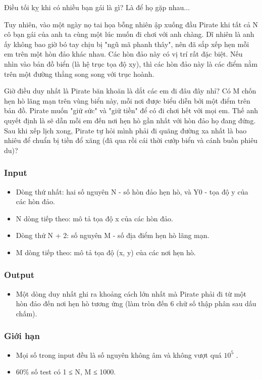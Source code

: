 



   Điều tối kỵ khi có nhiều bạn gái là gì? Là để họ gặp nhau...  

   Tuy nhiên, vào một ngày nọ tai họa bỗng nhiên ập xuống đầu Pirate khi tất cả N cô bạn gái của anh ta cùng một lúc muốn đi chơi với anh chàng. Dĩ nhiên là anh ấy không bao giờ bó tay chịu bị "ngũ mã phanh thây", nên đã sắp xếp hẹn mỗi em trên một hòn đảo khác nhau. Các hòn đảo này có vị trí rất đặc biệt. Nếu nhìn vào bản đồ biển (là hệ trục tọa độ xy), thì các hòn đảo này là các điểm nằm trên một đường thẳng song song với trục hoành.  

   Giờ điều duy nhất là Pirate băn khoăn là dắt các em đi đâu đây nhỉ? Có M chốn hẹn hò lãng mạn trên vùng biển này, mỗi nơi được biểu diễn bởi một điểm trên bản đồ. Pirate muốn "giữ sức" và "giữ tiền" để có đi chơi hết với mọi em. Thế anh quyết định là sẽ dẫn mỗi em đến nơi hẹn hò gần nhất với hòn đảo họ đang đứng. Sau khi xếp lịch xong, Pirate tự hỏi mình phải đi quãng đường xa nhất là bao nhiêu để chuẩn bị tiền đổ xăng (đã qua rồi cái thời cướp biển và cánh buồn phiêu du)?  

\subsubsection{   Input  }
\begin{itemize}
	\item     Dòng thứ nhất: hai số nguyên N - số hòn đảo hẹn hò, và Y0 - tọa độ y của các hòn đảo.   
	\item     N dòng tiếp theo: mô tả tọa độ x của các hòn đảo.   
	\item     Dòng thứ N + 2: số nguyên M - số địa điểm hẹn hò lãng mạn.   
	\item     M dòng tiếp theo: mô tả tọa độ (x, y) của các nơi hẹn hò.   
\end{itemize}

\subsubsection{   Output  }
\begin{itemize}
	\item     Một dòng duy nhất ghi ra khoảng cách lớn nhất mà Pirate phải đi từ một hòn đảo đến nơi hẹn hò tương ứng (làm tròn đến 6 chữ số thập phân sau dấu chấm).   
\end{itemize}

\subsubsection{   Giới hạn  }
\begin{itemize}
	\item     Mọi số trong input đều là số nguyên không âm và không vượt quá $10^{5}$    .   
	\item     60\% số test có 1 ≤ N, M ≤ 1000.   
\end{itemize}


